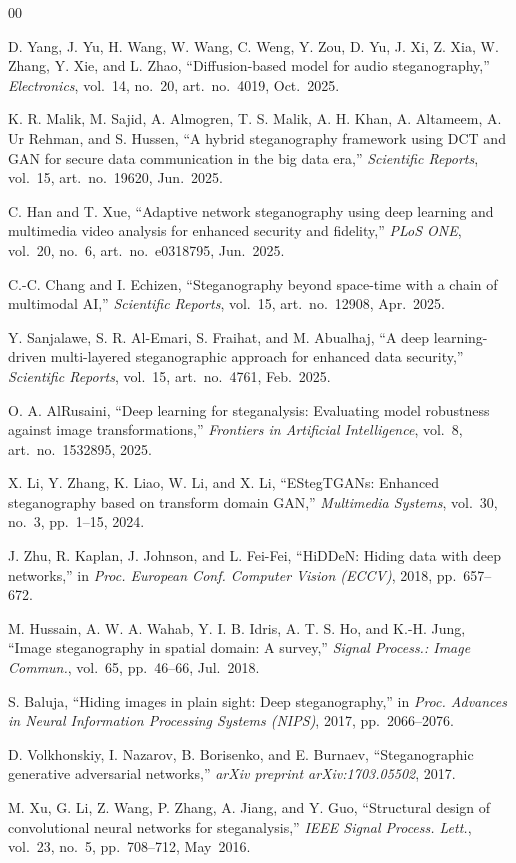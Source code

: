 \documentclass[conference]{IEEEtran}
\begin{document}
\begin{thebibliography}{00}

D. Yang, J. Yu, H. Wang, W. Wang, C. Weng, Y. Zou, D. Yu, J. Xi,
Z. Xia, W. Zhang, Y. Xie, and L. Zhao,
``Diffusion-based model for audio steganography,''
\textit{Electronics}, vol.~14, no.~20, art.~no.~4019, Oct.~2025.

K. R. Malik, M. Sajid, A. Almogren, T. S. Malik, A. H. Khan,
A. Altameem, A. Ur Rehman, and S. Hussen,
``A hybrid steganography framework using DCT and GAN for secure data
communication in the big data era,''
\textit{Scientific Reports}, vol.~15, art.~no.~19620, Jun.~2025.

C. Han and T. Xue,
``Adaptive network steganography using deep learning and multimedia
video analysis for enhanced security and fidelity,''
\textit{PLoS ONE}, vol.~20, no.~6, art.~no.~e0318795, Jun.~2025.

C.-C. Chang and I. Echizen,
``Steganography beyond space-time with a chain of multimodal AI,''
\textit{Scientific Reports}, vol.~15, art.~no.~12908, Apr.~2025.

Y. Sanjalawe, S. R. Al-Emari, S. Fraihat, and M. Abualhaj,
``A deep learning-driven multi-layered steganographic approach for
enhanced data security,''
\textit{Scientific Reports}, vol.~15, art.~no.~4761, Feb.~2025.

O. A. AlRusaini,
``Deep learning for steganalysis: Evaluating model robustness against
image transformations,''
\textit{Frontiers in Artificial Intelligence}, vol.~8,
art.~no.~1532895, 2025.

X. Li, Y. Zhang, K. Liao, W. Li, and X. Li,
``EStegTGANs: Enhanced steganography based on transform domain GAN,''
\textit{Multimedia Systems}, vol.~30, no.~3, pp.~1--15, 2024.

J. Zhu, R. Kaplan, J. Johnson, and L. Fei-Fei,
``HiDDeN: Hiding data with deep networks,''
in \textit{Proc. European Conf. Computer Vision (ECCV)},
2018, pp.~657--672.

M. Hussain, A. W. A. Wahab, Y. I. B. Idris, A. T. S. Ho, and K.-H. Jung,
``Image steganography in spatial domain: A survey,''
\textit{Signal Process.: Image Commun.}, vol.~65, pp.~46--66, Jul.~2018.

S. Baluja,
``Hiding images in plain sight: Deep steganography,''
in \textit{Proc. Advances in Neural Information Processing Systems
(NIPS)}, 2017, pp.~2066--2076.

D. Volkhonskiy, I. Nazarov, B. Borisenko, and E. Burnaev,
``Steganographic generative adversarial networks,''
\textit{arXiv preprint arXiv:1703.05502}, 2017.

M. Xu, G. Li, Z. Wang, P. Zhang, A. Jiang, and Y. Guo,
``Structural design of convolutional neural networks for steganalysis,''
\textit{IEEE Signal Process. Lett.}, vol.~23, no.~5,
pp.~708--712, May~2016.

\end{thebibliography}
\end{document}
